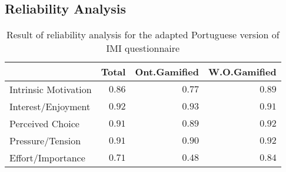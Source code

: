 \subsection{Reliability Analysis}

\begin{table}[!htbp]
\caption{Result of reliability analysis for the adapted Portuguese version of IMI questionnaire\label{rel}} 
\begin{center}
\begin{tabular}{lrrr}
\hline\hline
\multicolumn{1}{l}{}&\multicolumn{1}{c}{Total}&\multicolumn{1}{c}{Ont.Gamified}&\multicolumn{1}{c}{W.O.Gamified}\tabularnewline
\hline
Intrinsic Motivation&$0.86$&$0.77$&$0.89$\tabularnewline
Interest/Enjoyment&$0.92$&$0.93$&$0.91$\tabularnewline
Perceived Choice&$0.91$&$0.89$&$0.92$\tabularnewline
Pressure/Tension&$0.91$&$0.90$&$0.92$\tabularnewline
Effort/Importance&$0.71$&$0.48$&$0.84$\tabularnewline
\hline
\end{tabular}\end{center}

\end{table}

